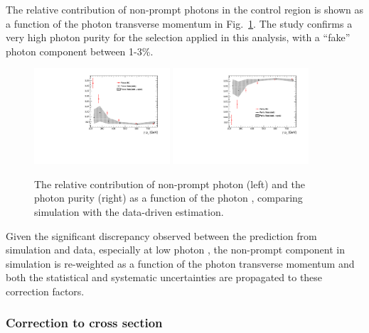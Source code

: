 The relative contribution of non-prompt photons in the \gj control region 
is shown as a function of the photon transverse momentum in Fig.~\ref{fig:photon-purities}.
The study confirms a very high photon purity for the selection applied in this analysis, 
with a ``fake'' photon component between 1-3\%. 

\begin{figure}[h!]
  \centering
  \includegraphics[width=0.45\textwidth]{figures/photonpurity/fakes} 
  \includegraphics[width=0.45\textwidth]{figures/photonpurity/purity} 
  \caption{\label{fig:photon-purities} 
  The relative contribution of non-prompt photon (left) and
  the photon purity (right) as a function of the photon \pt, 
  comparing simulation with the data-driven estimation. }
\end{figure}

Given the significant discrepancy observed between the prediction from simulation and data, 
especially at low photon \pt, 
the non-prompt component in simulation is re-weighted as a function of the photon transverse momentum 
and both the statistical and systematic uncertainties are propagated to these correction factors. 


\subsubsection{Correction to \texorpdfstring{\gj}{photon+jets} cross section}
\label{sec:gj-kfactor}

